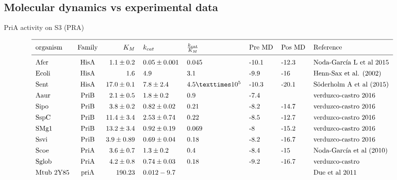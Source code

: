 \documentclass[12pt,twoside]{reedthesis}
\begin{document}
  \clearpage  
  
  \subsection{Molecular dynamics vs experimental
  data}\label{molecular-dynamics-vs-experimental-data}
  
  PriA activity on S3 (PRA)
  
  \[ 
    \begin{tabular}{ l c r l l l l l}
  \hline \\ [-1.5ex]
  organism  &Family & $K_M    $     & $k_{cat}$        & $\frac{k_{cat}}{K_M}$ &Pre MD & Pos MD & Reference  \\ [1ex]
  \hline \\ [-1.5ex]
  Afer        &HisA   & $1.1\pm0.2$   &$  0.05\pm0.001    $& 0.045                  &-10.1    &-12.3       &Noda-García L et al 2015\\ [1ex]
  Ecoli       &HisA   &$  1.6         $&$         4.9       $&3.1                   &-9.9   &-16       &Henn-Sax et al. (2002)\\ [1ex]
  Sent        &HisA   &$  17.0 \pm0.1 $&$ 7.8 \pm 2.4   $&$4.5 × 10^5          $&-10.3  &-20.1     &Söderholm A et al (2015)\\ [1ex]
  Aaur        &PriB   &$  2.1 \pm 0.5 $& $    1.8 \pm 0.2     $&0.9                   &-7.4   &              &verduzco-castro 2016\\ [1ex]
  Sipo        &PriB   &$  3.8\pm0.2     $&$0.82\pm0.02        $&0.21                  &-8.2     &-14.7       &verduzco-castro 2016\\ [1ex]
  SspC        &PriB   &$  11.4\pm3.4  $&$2.53\pm0.74      $&0.22                  &   -8.5    &-12.7     &verduzco-castro 2016\\ [1ex]
  SMg1        &PriB   &$  13.2\pm3.4  $&$0.92\pm0.19      $&0.069                 &-8     &-15.2     &verduzco-castro 2016\\ [1ex]
  Ssvi        &PriB   &$  3.9\pm0.89  $&$0.69\pm0.04      $&0.18                  &-8.2     &-16.7     &verduzco-castro 2016\\ [1ex]
  Scoe        &PriA   &$  3.6\pm0.7     $&$ 1.3\pm0.2     $  &0.4                   &-8.4   &-15       &Noda-García et al (2010)\\ [1ex]
  Sglob       &PriA   & $4.2\pm0.8     $ & $0.74\pm0.03    $   &0.18                  &-9.2     &-16.7       &verduzco-castro\\ [1ex]
  Mtub 2Y85   &priA   &$  19  0.23      $&$0.012  -9.7          $&                      &       &          &Due et al 2011\\ [1ex]

\end{tabular}\]
\end{document}

